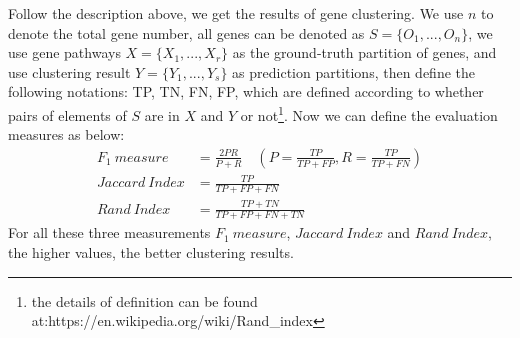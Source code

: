 \documentclass{bmcart}
\begin{document}
Follow the description above, we get the results of gene clustering. We use $n$ to denote the total gene number, all genes can be denoted as $S=\{O_1,...,O_n\}$, we use gene pathways $X=\{X_1,...,X_r\}$ as the ground-truth partition of genes, and use clustering result $Y=\{Y_1,...,Y_s\}$ as prediction partitions, then define the following notations: TP, TN, FN, FP, which are defined according to whether pairs of elements of $S$ are in $X$ and $Y$ or not\footnote{the details of definition can be found at:https://en.wikipedia.org/wiki/Rand\_index}.
Now we can define the evaluation measures as below:
\begin{equation}\label{}\nonumber
\begin{split}
F_{1}\ measure&=\frac{2PR}{P+R}\quad(P=\frac{TP}{TP+FP},  R=\frac{TP}{TP+FN}) \\
Jaccard\ Index&=\frac{TP}{TP+FP+FN}\\
Rand\ Index&=\frac{TP+TN}{TP+FP+FN+TN}
\end{split}
\end{equation}
For all these three measurements $F_1\ measure$, $Jaccard\ Index$ and $Rand\ Index$, the higher values, the better clustering results.
\end{document}
